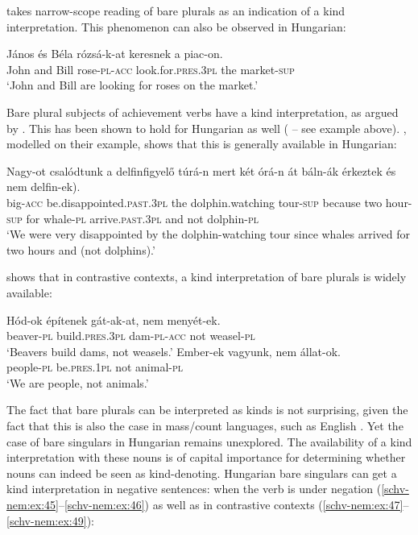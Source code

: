 \documentclass[output=paper]{langscibook}
\begin{document}
\noindent \citet{carlson-77} takes narrow-scope reading of bare plurals as an indication of a kind interpretation. This phenomenon can also be observed in Hungarian:  

\ea \label{schv-nem:ex:41}
\gll János és Béla rózsá-k-at keresnek a piac-on.\\
John and Bill rose-\textsc{pl}-\textsc{acc} look.for.\textsc{pres}.\textsc{3pl} the market-\textsc{sup}\\
\glt `John and Bill are looking for roses on the market.' \\\hfill \citep[p. 203, (13)]{schvarcz-rothstein-17}
\z

\noindent Bare plural subjects of achievement verbs have a kind interpretation, as argued by \citet{landman-rothstein-10}. This has been shown to hold for Hungarian as well (\citealt{schvarcz-rothstein-17} -- see example  above). , modelled on their example, shows that this is generally available in Hungarian:

\ea \label{schv-nem:ex:42}
\gll Nagy-ot csalódtunk a delfinfigyelő túrá-n mert két órá-n át báln-ák érkeztek \minsp{(} és nem delfin-ek).\\
big-\textsc{acc} be.disappointed.\textsc{past}.\textsc{3pl} the dolphin.watching tour-\textsc{sup} because two hour-\textsc{sup} for  whale-\textsc{pl}  arrive.\textsc{past}.\textsc{3pl} {} and not dolphin-\textsc{pl}\\
\glt `We were very disappointed by the dolphin-watching tour since whales arrived for two hours and (not dolphins).'  
\z

\noindent \citet{schvarcz-18} shows that in contrastive contexts, a kind interpretation of bare plurals is widely available:

\ea \label{schv-nem:ex:43}
\gll Hód-ok építenek gát-ak-at, nem menyét-ek.\\
beaver-\textsc{pl} build.\textsc{pres}.\textsc{3pl} dam-\textsc{pl}-\textsc{acc} not  weasel-\textsc{pl}\\
\glt `Beavers build dams, not weasels.' \hfill \citep[p. 116, (50a)]{schvarcz-18}
\ex \label{schv-nem:ex:44}
\gll Ember-ek vagyunk, nem állat-ok.\\
people-\textsc{pl} be.\textsc{pres}.\textsc{1pl} not animal-\textsc{pl}\\
\glt `We are people, not animals.'  \hfill \citep[p. 116, (50c)]{schvarcz-18}
\z

\noindent The fact that bare plurals can be interpreted as kinds is not surprising, given the fact that this is also the case in mass/count languages, such as English \citep{carlson-77}. Yet the case of bare singulars in Hungarian remains unexplored. The availability of a kind interpretation with these nouns is of capital importance for determining whether nouns can indeed be seen as kind-denoting. Hungarian bare singulars can get a kind interpretation in negative sentences: when the verb is under negation (\ref{schv-nem:ex:45}--\ref{schv-nem:ex:46}) as well as in contrastive contexts (\ref{schv-nem:ex:47}--\ref{schv-nem:ex:49}):
\end{document}
